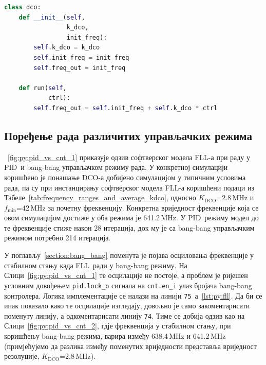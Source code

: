 \documentclass[master]{finthesis}
\newcommand*{\prog}[1]{\texttt{#1}}
\def \FLL  {FLL} %
\def \DCO  {DCO} %
\def \PID  {PID} %
\begin{document}
\begin{lstlisting}[language=Python, caption={Имплементација класе дигитално контролисаног осцилатора.}, label={lst:py:dco}]
class dco:
    def __init__(self,
                 k_dco,
                 init_freq):
        self.k_dco = k_dco
        self.init_freq = init_freq
        self.freq_out = init_freq

    def run(self,
            ctrl):
        self.freq_out = self.init_freq + self.k_dco * ctrl
\end{lstlisting}

\subsection{Поређење рада различитих управљачких режима} \label{section:python_model:pid_vs_cnt}
\figurename~\ref{fig:py:pid_vs_cnt_1} приказује одзив софтверског модела \FLL-а при раду у \PID\ и bang-bang управљачком режиму рада. У конкретној симулацији коришћено је понашање \DCO-а добијено симулацијом у типичним условима рада, па су при инстанцирању софтверског модела \FLL-а коришћени подаци из Табеле~\ref{tab:frequency_ranges_and_average_kdco}, односно $K_\text{DCO}$=2.8\,MHz и $f_\text{min}$=42\,MHz за почетну фреквенцију. Конкретна вриједност фреквенције која се овом симулацијом достиже у оба режима је 641.2\,MHz. У \PID\ режиму модел до те фреквенције стиже након 28 итерација, док му је са bang-bang управљачким режимом потребно 214 итерација. \par 

У поглављу~\ref{section:bang_bang} поменута је појава осциловања фреквенције у стабилном стању када \FLL\ ради у bang-bang режиму. На Слици~\ref{fig:py:pid_vs_cnt_1} те осцилације не постоје, а проблем је ријешен условним довођењем \prog{pid.lock\_o} сигнала на \prog{cnt.en\_i} улаз бројача bang-bang контролера. Логика имплементације се налази на линији \prog{75}~\lstlistingname{а}~\ref{lst:py:fll}. Да би се ипак показало како те осцилације изгледају, довољно је само закоментарисати поменуту линију, а одкоментарисати линију \prog{74}. Тиме се добија одзив као на Слици~\ref{fig:py:pid_vs_cnt_2}, гдје фреквенција у стабилном стању, при коришћењу bang-bang режима, варира између 638.4\,MHz и 641.2\,MHz (примјећујемо да разлика између поменутих вриједности представља вриједност резолуције, $K_\text{DCO}$=2.8\,MHz).

\end{document}
